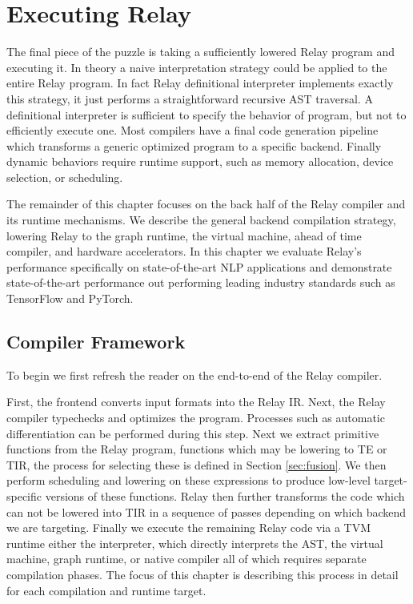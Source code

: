 \chapter{Executing Relay}
\label{ch:execute}

The final piece of the puzzle is taking a sufficiently
    lowered Relay program and executing it.
In theory a naive interpretation strategy could be applied
    to the entire Relay program.
In fact Relay definitional interpreter
  implements exactly this strategy,
  it just performs a straightforward recursive AST traversal.
A definitional interpreter is sufficient to
  specify the behavior of program, but not
  to efficiently execute one.
 Most compilers have a final code generation
  pipeline which transforms a generic optimized
  program to a specific backend.
Finally dynamic behaviors require
  runtime support, such as memory allocation,
  device selection, or scheduling.

The remainder of this chapter focuses on the back
  half of the Relay compiler and its runtime mechanisms.
We describe the general backend compilation strategy,
  lowering Relay to the graph runtime, the virtual machine,
  ahead of time compiler, and hardware accelerators.
In this chapter we evaluate Relay's performance specifically
  on state-of-the-art NLP applications and demonstrate
  state-of-the-art performance out performing leading industry standards
  such as TensorFlow and PyTorch.

\section{Compiler Framework}

To begin we first refresh the reader on the end-to-end
  of the Relay compiler.

First, the frontend converts input formats into the Relay IR.
Next, the Relay compiler typechecks and optimizes the program.
Processes such as automatic differentiation can be performed
  during this step.
Next we extract primitive functions
  from the Relay program, functions which may be lowering to TE or TIR,
  the process for selecting these
  is defined in Section \ref{sec:fusion}.
We then perform scheduling and lowering on these
  expressions to produce low-level target-specific versions
  of these functions.
Relay then further transforms the code which can not be lowered
  into TIR in a sequence of passes depending on which backend
  we are targeting.
Finally we execute the remaining Relay code via a TVM runtime
  either the interpreter, which directly interprets the AST,
  the virtual machine, graph runtime, or native compiler all
  of which requires separate compilation phases.
The focus of this chapter is describing this process in
  detail for each compilation and runtime target.

